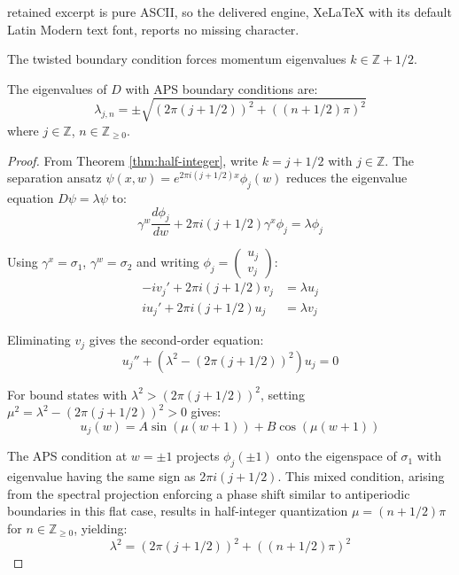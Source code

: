 \documentclass[10pt,a4paper]{amsart}
\newcommand{\ZZ}{\mathbb{Z}}
\begin{document}
retained excerpt is pure ASCII, so the delivered engine, XeLaTeX with its default Latin Modern text font, reports no missing character.
\begin{theorem}\label{thm:half-integer}
The twisted boundary condition forces momentum eigenvalues $k \in \ZZ + 1/2$.
\end{theorem}

\begin{theorem}\label{thm:complete-spectrum}
The eigenvalues of $D$ with APS boundary conditions are:
\[
\lambda_{j,n} = \pm\sqrt{(2\pi(j + 1/2))^2 + ((n + 1/2)\pi)^2}
\]
where $j \in \ZZ$, $n \in \ZZ_{\geq 0}$.
\end{theorem}

\begin{proof}
From Theorem \ref{thm:half-integer}, write $k = j + 1/2$ with $j \in \ZZ$. The separation ansatz $\psi(x,w) = e^{2\pi i(j+1/2)x}\phi_j(w)$ reduces the eigenvalue equation $D\psi = \lambda\psi$ to:
\[
\gamma^w \frac{d\phi_j}{dw} + 2\pi i(j+1/2)\gamma^x \phi_j = \lambda \phi_j
\]

Using $\gamma^x = \sigma_1$, $\gamma^w = \sigma_2$ and writing $\phi_j = \begin{pmatrix} u_j \\ v_j \end{pmatrix}$:
\begin{align}
-iv_j' + 2\pi i(j+1/2)v_j &= \lambda u_j \\
iu_j' + 2\pi i(j+1/2)u_j &= \lambda v_j
\end{align}

Eliminating $v_j$ gives the second-order equation:
\[
u_j'' + (\lambda^2 - (2\pi(j+1/2))^2)u_j = 0
\]

For bound states with $\lambda^2 > (2\pi(j+1/2))^2$, setting $\mu^2 = \lambda^2 - (2\pi(j+1/2))^2 > 0$ gives:
\[
u_j(w) = A\sin(\mu(w+1)) + B\cos(\mu(w+1))
\]

The APS condition at $w=\pm 1$ projects $\phi_j(\pm 1)$ onto the eigenspace of $\sigma_1$ with eigenvalue having the same sign as $2\pi i(j+1/2)$. This mixed condition, arising from the spectral projection enforcing a phase shift similar to antiperiodic boundaries in this flat case, results in half-integer quantization $\mu = (n+1/2)\pi$ for $n \in \ZZ_{\geq 0}$, yielding:
\[
\lambda^2 = (2\pi(j+1/2))^2 + ((n+1/2)\pi)^2
\]
\end{proof}
\end{document}
